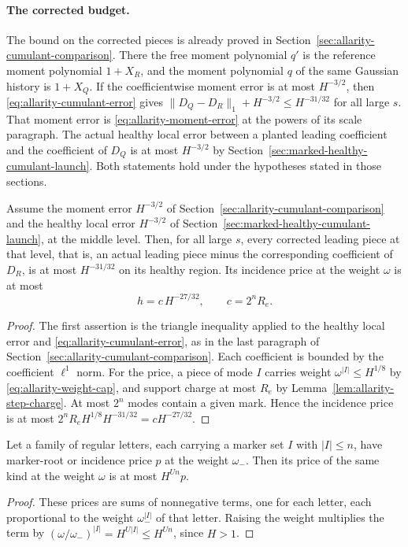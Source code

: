 \paragraph{The corrected budget.}
The bound on the corrected pieces is already proved in
Section~\ref{sec:allarity-cumulant-comparison}. There the free moment
polynomial $q'$ is the reference moment polynomial $1+X_R$, and the
moment polynomial $q$ of the same Gaussian history is $1+X_Q$. If the
coefficientwise moment error is at most $H^{-3/2}$, then
\eqref{eq:allarity-cumulant-error} gives
$\|D_Q-D_R\|_1+H^{-3/2}\le H^{-31/32}$ for all large $s$. That moment
error is \eqref{eq:allarity-moment-error} at the powers of its scale
paragraph. The actual healthy local error between a planted leading
coefficient and the coefficient of $D_Q$ is at most $H^{-3/2}$ by
Section~\ref{sec:marked-healthy-cumulant-launch}. Both statements hold
under the hypotheses stated in those sections.

\begin{lemma}
\label{lem:allarity-corrected-pieces}
Assume the moment error $H^{-3/2}$ of
Section~\ref{sec:allarity-cumulant-comparison} and the healthy local error
$H^{-3/2}$ of Section~\ref{sec:marked-healthy-cumulant-launch}, at the
middle level. Then, for all large $s$, every corrected leading piece at
that level, that is, an actual leading piece minus the corresponding
coefficient of $D_R$, is at most $H^{-31/32}$ on its healthy region. Its
incidence price at the weight $\omega$ is at most
\[
 h=c\,H^{-27/32},\qquad c=2^nR_e .
\]
\end{lemma}
\begin{proof}
The first assertion is the triangle inequality applied to the healthy
local error and \eqref{eq:allarity-cumulant-error}, as in the last
paragraph of Section~\ref{sec:allarity-cumulant-comparison}. Each
coefficient is bounded by the coefficient $\ell^1$ norm. For the price, a
piece of mode $I$ carries weight $\omega^{|I|}\le H^{1/8}$ by
\eqref{eq:allarity-weight-cap}, and support charge at most $R_e$ by
Lemma~\ref{lem:allarity-step-charge}. At most $2^n$ modes contain a given
mark. Hence the incidence price is at most
$2^nR_eH^{1/8}H^{-31/32}=cH^{-27/32}$.
\end{proof}

\begin{lemma}
\label{lem:allarity-weight-raise}
Let a family of regular letters, each carrying a marker set $I$ with
$|I|\le n$, have marker-root or incidence price $p$ at the weight
$\omega_-$. Then its price of the same kind at the weight $\omega$ is at
most $H^{Un}p$.
\end{lemma}
\begin{proof}
These prices are sums of nonnegative terms, one for each letter, each
proportional to the weight $\omega_-^{|I|}$ of that letter. Raising the
weight multiplies the term by $(\omega/\omega_-)^{|I|}=H^{U|I|}\le
H^{Un}$, since $H>1$.
\end{proof}

